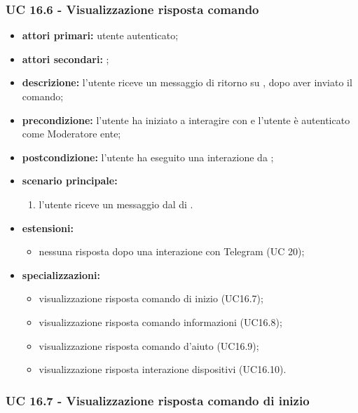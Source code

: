 
	\subsubsection{UC 16.6 - Visualizzazione risposta comando }

	\begin{itemize}
		\item \textbf{attori primari:} utente autenticato;
		\item \textbf{attori secondari:} ;
		\item \textbf{descrizione:} l'utente riceve un messaggio di ritorno su , dopo aver inviato il comando;
		\item \textbf{precondizione:} l'utente ha iniziato a interagire con  e l'utente è autenticato come Moderatore ente;
		\item \textbf{postcondizione:} l'utente ha eseguito una interazione da ;
		\item \textbf{scenario principale:}
		\begin{enumerate}
			\item l'utente riceve un messaggio dal  di .
		\end{enumerate}
		\item \textbf{estensioni:}
		\begin{itemize}
			\item nessuna risposta dopo una interazione con Telegram (UC 20);
		\end{itemize}
		\item \textbf{specializzazioni:}
		\begin{itemize}
			\item visualizzazione risposta comando di inizio (UC16.7);
			\item visualizzazione risposta comando informazioni (UC16.8);
			\item visualizzazione risposta comando d'aiuto (UC16.9);
			\item visualizzazione risposta interazione dispositivi (UC16.10).
		\end{itemize}
	\end{itemize}

	\subsubsection{UC 16.7 - Visualizzazione risposta comando di inizio }

